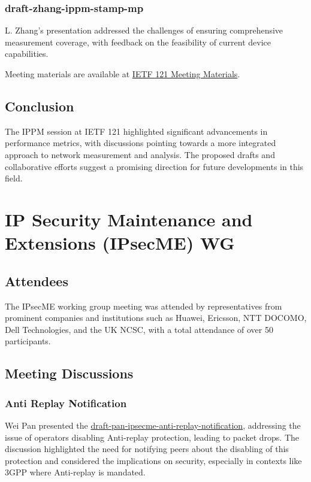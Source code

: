 \documentclass{article}
\begin{document}
\subsubsection{draft-zhang-ippm-stamp-mp}
L. Zhang's presentation addressed the challenges of ensuring comprehensive measurement coverage, with feedback on the feasibility of current device capabilities.

Meeting materials are available at \href{https://datatracker.ietf.org/meeting/121/materials.html}{IETF 121 Meeting Materials}.

\subsection{Conclusion}
The IPPM session at IETF 121 highlighted significant advancements in performance metrics, with discussions pointing towards a more integrated approach to network measurement and analysis. The proposed drafts and collaborative efforts suggest a promising direction for future developments in this field.



\newpage

\section{IP Security Maintenance and Extensions (IPsecME) WG}

\subsection{Attendees}

The IPsecME working group meeting was attended by representatives from prominent companies and institutions such as Huawei, Ericsson, NTT DOCOMO, Dell Technologies, and the UK NCSC, with a total attendance of over 50 participants.

\subsection{Meeting Discussions}

\subsubsection{Anti Replay Notification}

Wei Pan presented the \href{https://datatracker.ietf.org/doc/html/draft-pan-ipsecme-anti-replay-notification}{draft-pan-ipsecme-anti-replay-notification}, addressing the issue of operators disabling Anti-replay protection, leading to packet drops. The discussion highlighted the need for notifying peers about the disabling of this protection and considered the implications on security, especially in contexts like 3GPP where Anti-replay is mandated.
\end{document}
